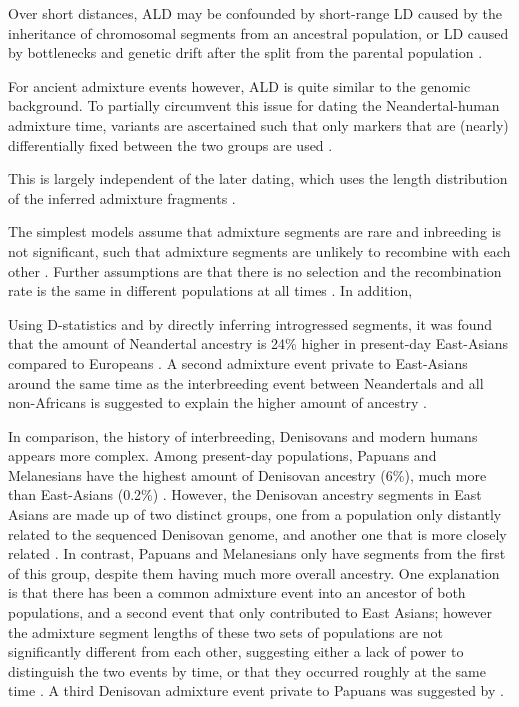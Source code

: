



Over short distances, ALD may be confounded by short-range LD caused by the inheritance of chromosomal segments from an ancestral population, or LD caused by bottlenecks and genetic drift after the split from the parental population \citep{moorjani_history_2011}.

For ancient admixture events however, ALD is quite similar to the genomic background. To partially circumvent this issue for dating the Neandertal-human admixture time, variants are ascertained such that only  markers that are (nearly) differentially fixed between the two groups are used 
\citep{sankararaman_date_2012}. 

This is largely independent of the later dating, which uses the length distribution of the inferred admixture fragments \cite{hellenthal_genetic_2014}.

 The simplest models assume that admixture segments are rare and inbreeding is not significant, such that admixture segments are unlikely to recombine with each other \citep{pool_inference_2009,liang_lengths_2014}. Further assumptions are that there is no selection \citep{shchur_distribution_2019} and the recombination rate is the same in different populations at all times \citep{gravel_population_2012}. In addition, 


Using D-statistics \citep{green_draft_2010} and by directly inferring introgressed segments, it was found that the amount of Neandertal ancestry is 24\% higher in present-day East-Asians compared to Europeans \citep{meyer_high-coverage_2012,  wall_higher_2013}. A second admixture event private to East-Asians around the same time as the interbreeding event between Neandertals and all non-Africans is suggested to explain the higher amount of ancestry \citep{kim_selection_2015,vernot_complex_2015}.

In comparison, the history of interbreeding, Denisovans and modern humans appears more complex. Among present-day populations, Papuans and Melanesians have the highest amount of Denisovan ancestry (6\%), much more than East-Asians (0.2\%) \citep{reich_genetic_2010,meyer_high-coverage_2012}.
However, the Denisovan ancestry segments in East Asians are made up of two distinct groups, one from a population only distantly related to the sequenced Denisovan genome, and another one that is more closely related \citep{browning_analysis_2018}. In contrast, Papuans and Melanesians only have segments from the first of this group, despite them having much more overall ancestry.
One explanation is that there has been a common admixture event into an ancestor of both populations, and a second event that only contributed to East Asians; however the admixture segment lengths of these two sets of populations are not significantly different from each other, suggesting either a lack of power to distinguish the two events by time, or that they occurred roughly at the same time \citep{browning_analysis_2018}. A third  Denisovan admixture event private to Papuans was suggested by \cite{jacobs_multiple_2019}.



